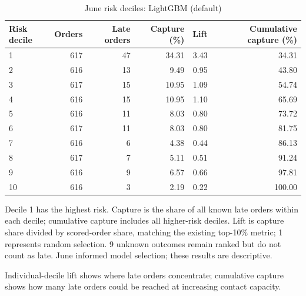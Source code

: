 \begin{table}[htbp]
\centering
\small
\caption{June risk deciles: LightGBM (default)}
\begin{tabular}{lrrrrr}
\toprule
Risk decile & Orders & Late orders & Capture (\%) & Lift & Cumulative capture (\%) \\
\midrule
1 & 617 & 47 & 34.31 & 3.43 & 34.31 \\
2 & 616 & 13 & 9.49 & 0.95 & 43.80 \\
3 & 617 & 15 & 10.95 & 1.09 & 54.74 \\
4 & 616 & 15 & 10.95 & 1.10 & 65.69 \\
5 & 616 & 11 & 8.03 & 0.80 & 73.72 \\
6 & 617 & 11 & 8.03 & 0.80 & 81.75 \\
7 & 616 & 6 & 4.38 & 0.44 & 86.13 \\
8 & 617 & 7 & 5.11 & 0.51 & 91.24 \\
9 & 616 & 9 & 6.57 & 0.66 & 97.81 \\
10 & 616 & 3 & 2.19 & 0.22 & 100.00 \\
\bottomrule
\end{tabular}
\par\smallskip\begin{minipage}{\linewidth}\footnotesize Decile 1 has the highest risk. Capture is the share of all known late orders within each decile; cumulative capture includes all higher-risk deciles. Lift is capture share divided by scored-order share, matching the existing top-10\% metric; 1 represents random selection. 9 unknown outcomes remain ranked but do not count as late. June informed model selection; these results are descriptive.\end{minipage}
\end{table}
Individual-decile lift shows where late orders concentrate; cumulative capture shows how many late orders could be reached at increasing contact capacity.
